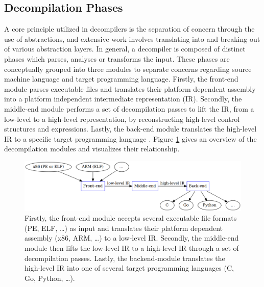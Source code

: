 
\subsection{Decompilation Phases}
\label{sec:decompilation_phases}

A core principle utilized in decompilers is the separation of concern through the use of abstractions, and extensive work involves translating into and breaking out of various abstraction layers. In general, a decompiler is composed of distinct phases which parses, analyses or transforms the input. These phases are conceptually grouped into three modules to separate concerns regarding source machine language and target programming language. Firstly, the front-end module parses executable files and translates their platform dependent assembly into a platform independent intermediate representation (IR). Secondly, the middle-end module performs a set of decompilation passes to lift the IR, from a low-level to a high-level representation, by reconstructing high-level control structures and expressions. Lastly, the back-end module translates the high-level IR to a specific target programming language \cite{reverse_comp}. Figure \ref{fig:modules_overview} gives an overview of the decompilation modules and visualizes their relationship.

\begin{figure}[htbp]
	\begin{center}
		\includegraphics[width=\textwidth]{inc/modules_overview.png}
		\caption{Firstly, the front-end module accepts several executable file formats (PE, ELF, …) as input and translates their platform dependent assembly (x86, ARM, …) to a low-level IR. Secondly, the middle-end module then lifts the low-level IR to a high-level IR through a set of decompilation passes. Lastly, the backend-module translates the high-level IR into one of several target programming languages (C, Go, Python, …).}
		\label{fig:modules_overview}
	\end{center}
\end{figure}

